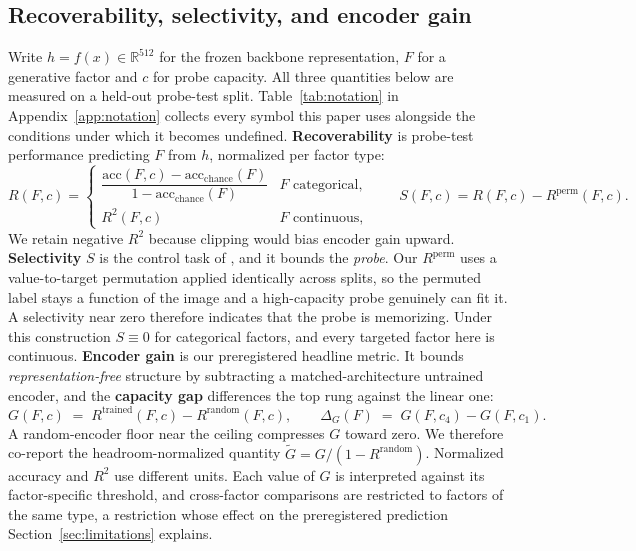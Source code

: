 \documentclass[10pt]{article}
\newcommand{\R}{R}
\newcommand{\Sel}{S}
\newcommand{\G}{G}
\begin{document}
\subsection{Recoverability, selectivity, and encoder gain}
Write $h = f(x) \in \mathbb{R}^{512}$ for the frozen backbone representation, $F$ for a generative
factor and $c$ for probe capacity. All three quantities below are measured on a held-out probe-test split.
Table~\ref{tab:notation} in Appendix~\ref{app:notation} collects every symbol this paper uses
alongside the conditions under which it becomes undefined.
\textbf{Recoverability} is probe-test performance predicting $F$ from $h$, normalized per factor
type:
\begin{equation}
\R(F, c) =
\begin{cases}
\dfrac{\mathrm{acc}(F,c) - \mathrm{acc}_{\mathrm{chance}}(F)}{1 - \mathrm{acc}_{\mathrm{chance}}(F)}
  & F \text{ categorical},\\[1.8ex]
R^2(F, c) & F \text{ continuous},
\end{cases}
\qquad
\Sel(F, c) = \R(F, c) - \R^{\mathrm{perm}}(F, c).
\label{eq:RS}
\end{equation}
We retain negative $R^2$ because clipping would bias encoder gain upward.
\textbf{Selectivity} $\Sel$ is the control task of \citet{hewitt2019designing}, and it bounds the
\emph{probe}. Our $\R^{\mathrm{perm}}$ uses a value-to-target permutation applied identically across
splits, so the permuted label stays a function of the image and a high-capacity probe genuinely can
fit it. A selectivity near zero therefore indicates that the probe is memorizing. Under this
construction $\Sel \equiv 0$ for categorical factors, and every targeted factor here is continuous.
\textbf{Encoder gain} is our preregistered headline metric. It bounds \emph{representation-free}
structure by
subtracting a matched-architecture untrained encoder, and the \textbf{capacity gap} differences the
top rung against the linear one:
\begin{equation}
\G(F, c) \;=\; \R^{\mathrm{trained}}(F, c) - \R^{\mathrm{random}}(F, c),
\qquad
\Delta_{\G}(F) \;=\; \G(F, c_4) - \G(F, c_1).
\label{eq:G}
\end{equation}
A random-encoder floor near the ceiling compresses $\G$ toward zero. We therefore co-report the
headroom-normalized quantity $\tilde{\G} = \G / (1 - \R^{\mathrm{random}})$. Normalized accuracy and
$R^2$ use different units. Each value of $\G$ is interpreted against its factor-specific threshold,
and cross-factor comparisons are restricted to factors of the same type, a restriction whose effect
on the preregistered prediction Section~\ref{sec:limitations} explains.
\end{document}
